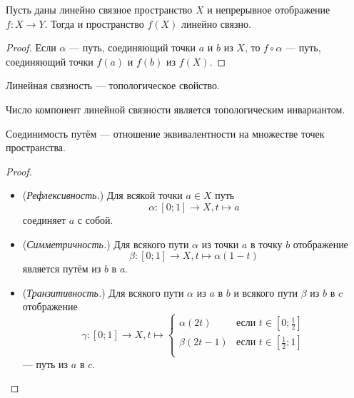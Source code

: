 \documentclass[12pt,a4paper]{article}
\begin{document}
    \begin{theorem}
        Пусть даны линейно связное пространство $X$ и непрерывное отображение $f: X \to Y$. Тогда и пространство $f(X)$ линейно связно.
    \end{theorem}

    \begin{proof}
        Если $\alpha$ --- путь, соединяющий точки $a$ и $b$ из $X$, то $f \circ \alpha$ --- путь, соединяющий точки $f(a)$ и $f(b)$ из $f(X)$.
    \end{proof}

    \begin{corollary}
        Линейная связность --- топологическое свойство.
    \end{corollary}
    
    \begin{corollary}
        Число компонент линейной связности является топологическим инвариантом.
    \end{corollary}

    \begin{lemma}
        Соединимость путём --- отношение эквивалентности на множестве точек пространства.
    \end{lemma}

    \begin{proof}
        \begin{itemize}
            \item (\emph{Рефлексивность.}) Для всякой точки $a \in X$ путь \[\alpha: [0; 1] \to X, t \mapsto a\] соединяет $a$ с собой.
            \item (\emph{Симметричность.}) Для всякого пути $\alpha$ из точки $a$ в точку $b$ отображение \[\beta: [0; 1] \to X, t \mapsto \alpha(1 - t)\] является путём из $b$ в $a$.
            \item (\emph{Транзитивность.}) Для всякого пути $\alpha$ из $a$ в $b$ и всякого пути $\beta$ из $b$ в $c$ отображение
                \[\gamma: [0; 1] \to X, t \mapsto
                    \begin{cases}
                        \alpha(2t)& \text{если $t \in [0; \frac{1}{2}]$}\\
                        \beta(2t-1)& \text{если $t \in [\frac{1}{2}; 1]$}\\
                    \end{cases}
                \]
                --- путь из $a$ в $c$.
        \end{itemize}
    \end{proof}
\end{document}
